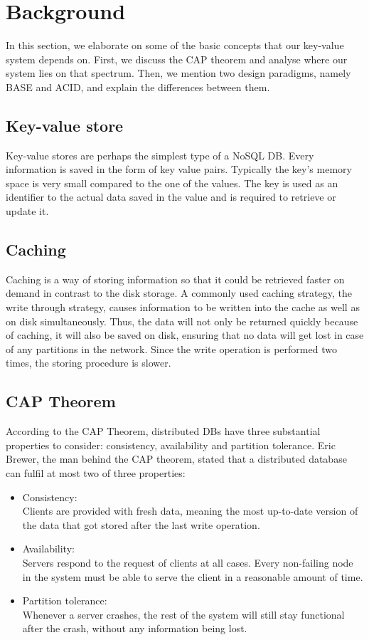 \section{Background}
\label{sec:background}
In this section, we elaborate on some of the basic concepts that our key-value system depends on. First, we discuss the CAP theorem and analyse where our system lies on that spectrum. Then, we mention two design paradigms, namely BASE and ACID, and explain the differences between them.

\subsection{Key-value store}
Key-value stores are perhaps the simplest type of a NoSQL DB. Every information is saved in the form of key value pairs. Typically the key’s memory space is very small compared to the one of the values. The key is used as an identifier to the actual data saved in the value and is required to retrieve or update it.

\subsection{Caching}
\label{sec:caching}
Caching is a way of storing information so that it could be retrieved faster on demand in contrast to the disk storage. A commonly used caching strategy, the write through strategy, causes information to be written into the cache as well as on disk simultaneously. Thus, the data will not only be returned quickly because of caching, it will also be saved on disk, ensuring that no data will get lost in case of any partitions in the network. Since the write operation is performed two times, the storing procedure is slower.

\subsection{CAP Theorem}
\label{sec:background_cap} 
According to the CAP Theorem, distributed DBs have three substantial properties to consider: consistency, availability and partition tolerance\cite{brewer2012cap}. Eric Brewer, the man behind the CAP theorem, stated that a distributed database can fulfil at most two of three properties\cite{brewer2000cap}:

\begin{itemize}
  \item Consistency: \\
  Clients are provided with fresh data, meaning the most up-to-date version of the data that got stored after the last write operation.
  \item Availability: \\
  Servers respond to the request of clients at all cases. Every non-failing node in the system must be able to serve the client in a reasonable amount of time\cite{gilbert2002brewer}.
  \item Partition tolerance: \\
  Whenever a server crashes, the rest of the system will still stay functional after the crash, without any information being lost.
\end{itemize}

